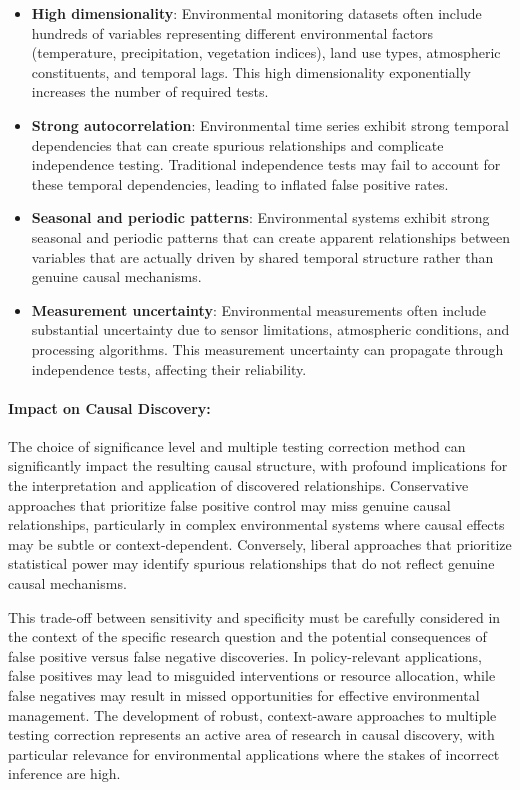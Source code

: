 \begin{itemize}
	\item \textbf{High dimensionality}: Environmental monitoring datasets often include hundreds of variables representing different environmental factors (temperature, precipitation, vegetation indices), land use types, atmospheric constituents, and temporal lags. This high dimensionality exponentially increases the number of required tests.

	\item \textbf{Strong autocorrelation}: Environmental time series exhibit strong temporal dependencies that can create spurious relationships and complicate independence testing. Traditional independence tests may fail to account for these temporal dependencies, leading to inflated false positive rates.

	\item \textbf{Seasonal and periodic patterns}: Environmental systems exhibit strong seasonal and periodic patterns that can create apparent relationships between variables that are actually driven by shared temporal structure rather than genuine causal mechanisms.

	\item \textbf{Measurement uncertainty}: Environmental measurements often include substantial uncertainty due to sensor limitations, atmospheric conditions, and processing algorithms. This measurement uncertainty can propagate through independence tests, affecting their reliability.
\end{itemize}

\paragraph{Impact on Causal Discovery:}

The choice of significance level and multiple testing correction method can significantly impact the resulting causal structure, with profound implications for the interpretation and application of discovered relationships. Conservative approaches that prioritize false positive control may miss genuine causal relationships, particularly in complex environmental systems where causal effects may be subtle or context-dependent. Conversely, liberal approaches that prioritize statistical power may identify spurious relationships that do not reflect genuine causal mechanisms.

This trade-off between sensitivity and specificity must be carefully considered in the context of the specific research question and the potential consequences of false positive versus false negative discoveries. In policy-relevant applications, false positives may lead to misguided interventions or resource allocation, while false negatives may result in missed opportunities for effective environmental management. The development of robust, context-aware approaches to multiple testing correction represents an active area of research in causal discovery, with particular relevance for environmental applications where the stakes of incorrect inference are high.

